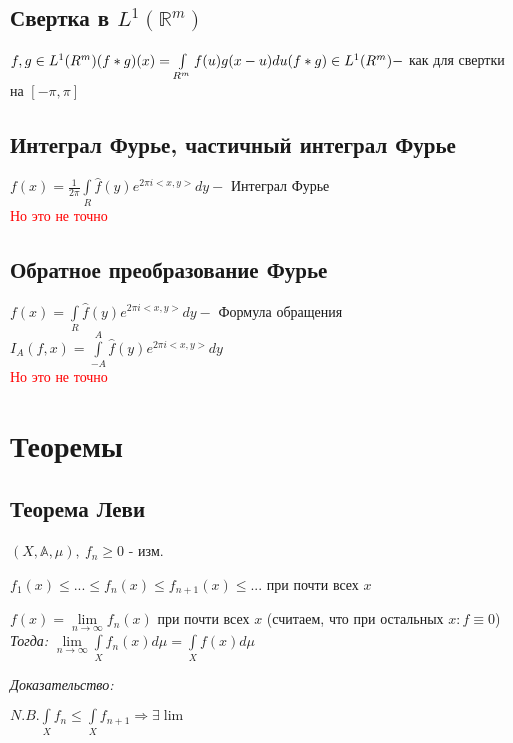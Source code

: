 \documentclass[paper=a4, fontsize=14pt]{report}
\begin{document}
	\section{Свертка в $L^1(\mathbb R^m)$}
	
	$ f,g \in L^1(R^m) \\ (f*g)(x) = \int\limits_{R^m} f(u)g(x-u)du \\ (f*g) \in L^1(R^m) -$ как для свертки на $[-\pi, \pi]$
	
	\section{Интеграл Фурье, частичный интеграл Фурье}
	
	$f(x) = \frac{1}{2\pi} \int\limits_{R} \widehat{f}(y)e^{2\pi i<x,y>}dy -$ Интеграл Фурье \\ \textcolor{red}{Но это не точно}
	
	\section{Обратное преобразование Фурье}
	
	$f(x) = \int\limits_{R} \widehat{f}(y)e^{2\pi i<x,y>}dy -$ Формула обращения \\
$I_{A}(f,x) = \int\limits_{-A}^{A} \widehat{f}(y)e^{2\pi i<x,y>}dy $\\ \textcolor{red}{Но это не точно}
	
\chapter{Теоремы}
\section{Теорема Леви}
$(X,\mathds{A},\mu),\ f_n \geqslant 0$ - изм.

$f_1(x) \leqslant ...\leqslant f_n(x) \leqslant f_{n+1}(x) \leqslant ...$ при почти всех $x$

$f(x) = \lim\limits_{n \rightarrow \infty}f_n(x)$ при почти всех $x$ (считаем, что при остальных $x: f \equiv 0$)
\\

\emph{Тогда:} $\lim\limits_{n \rightarrow \infty} \int\limits_{X}f_n(x)d\mu = \int\limits_{X}f(x)d\mu$

\emph{Доказательство:}

$N.B. \int\limits_{X}f_n \leqslant \int\limits_{X}f_{n+1} \Rightarrow \exists \lim$
\end{document}
